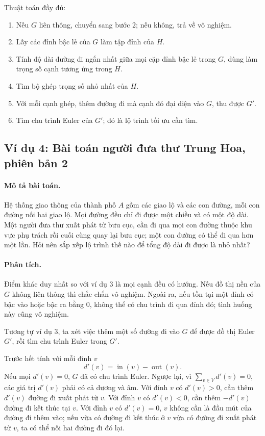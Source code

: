 \documentclass[11pt]{article}
\newcommand{\indeg}{\operatorname{in}}
\newcommand{\outdeg}{\operatorname{out}}
\begin{document}
Thuật toán đầy đủ:
\begin{enumerate}
  \item Nếu \(G\) liên thông, chuyển sang bước 2; nếu không, trả về vô nghiệm.
  \item Lấy các đỉnh bậc lẻ của \(G\) làm tập đỉnh của \(H\).
  \item Tính độ dài đường đi ngắn nhất giữa mọi cặp đỉnh bậc lẻ trong \(G\),
  dùng làm trọng số cạnh tương ứng trong \(H\).
  \item Tìm bộ ghép trọng số nhỏ nhất của \(H\).
  \item Với mỗi cạnh ghép, thêm đường đi mà cạnh đó đại diện vào \(G\), thu
  được \(G'\).
  \item Tìm chu trình Euler của \(G'\); đó là lộ trình tối ưu cần tìm.
\end{enumerate}

\subsection{Ví dụ 4: Bài toán người đưa thư Trung Hoa, phiên bản 2}

\paragraph{Mô tả bài toán.}
Hệ thống giao thông của thành phố \(A\) gồm các giao lộ và các con đường, mỗi
con đường nối hai giao lộ. Mọi đường đều chỉ đi được một chiều và có một độ
dài. Một người đưa thư xuất phát từ bưu cục, cần đi qua mọi con đường thuộc
khu vực phụ trách rồi cuối cùng quay lại bưu cục; một con đường có thể đi qua
hơn một lần. Hỏi nên sắp xếp lộ trình thế nào để tổng độ dài đi được là nhỏ
nhất?

\paragraph{Phân tích.}
Điểm khác duy nhất so với ví dụ 3 là mọi cạnh đều có hướng. Nếu đồ thị nền của
\(G\) không liên thông thì chắc chắn vô nghiệm. Ngoài ra, nếu tồn tại một đỉnh
có bậc vào hoặc bậc ra bằng \(0\), không thể có chu trình đi qua đỉnh đó; tình
huống này cũng vô nghiệm.

Tương tự ví dụ 3, ta xét việc thêm một số đường đi vào \(G\) để được đồ thị
Euler \(G'\), rồi tìm chu trình Euler trong \(G'\).

Trước hết tính với mỗi đỉnh \(v\)
\[
  d'(v)=\indeg(v)-\outdeg(v).
\]
Nếu mọi \(d'(v)=0\), \(G\) đã có chu trình Euler. Ngược lại, vì
\(\sum_{v\in V}d'(v)=0\), các giá trị \(d'(v)\) phải có cả dương và âm. Với
đỉnh \(v\) có \(d'(v)>0\), cần thêm \(d'(v)\) đường đi xuất phát từ \(v\). Với
đỉnh \(v\) có \(d'(v)<0\), cần thêm \(-d'(v)\) đường đi kết thúc tại \(v\).
Với đỉnh \(v\) có \(d'(v)=0\), \(v\) không cần là đầu mút của đường đi thêm
vào; nếu vừa có đường đi kết thúc ở \(v\) vừa có đường đi xuất phát từ \(v\),
ta có thể nối hai đường đi đó lại.
\end{document}
